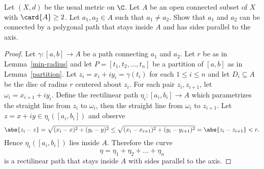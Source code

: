 \documentclass[12pt]{amsart}
\begin{document}
\begin{setup}
  Let $(X,d)$ be the usual metric on $\C$.
  Let $A$ be an open connected subset of $X$ with $\card{A} \geq 2$.
  Let $a_1, a_2 \in A$ such that $a_1 \not = a_2$.
  Show that $a_1$ and $a_2$ can be connected by a polygonal path that stays inside $A$ and has sides parallel to the axis.

  \begin{proof}
    Let $\gamma \colon [a,b] \rightarrow A$ be a path connecting $a_1$ and $a_2$.
    Let $r$ be as in Lemma~\ref{min-radius} and let $P = [t_1, t_2, \ldots, t_n]$ be a partition of $[a,b]$ as in Lemma~\ref{partition}.
    Let $z_i = x_i + iy_i = \gamma(t_i)$ for each $1 \leq i \leq n$ and let $D_i \subseteq A$ be the disc of radius $r$ centered about $z_i$.
    For each pair $z_i, z_{i+1}$, let $\omega_i = x_{i+1} + iy_i$.
    Define the rectilinear path $\eta_i : [a_i, b_i] \rightarrow A$ which parametrizes the straight line from $z_i$ to $\omega_i$, then the straight line from $\omega_i$ to $z_{i+1}$.
    Let $z = x + iy \in \eta_i([a_i, b_i])$ and observe 
    $$\abs{z_i - z} = \sqrt{(x_i - x)^2 + (y_i - y)^2} \leq \sqrt{(x_i - x_{i+1})^2 + (y_i - y_{i+1})^2} = \abs{z_i - z_{i+1}} < r.$$
    Hence $\eta_i([a_i, b_i])$ lies inside $A$.
    Therefore the curve $$\eta = \eta_1 + \eta_2 + \ldots + \eta_n$$ is a rectilinear path that stays inside $A$ with sides parallel to the axis.
    
  \end{proof}
\end{setup}
\end{document}
